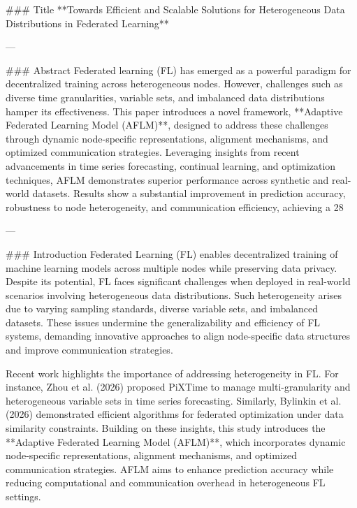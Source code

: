 ### Title
**Towards Efficient and Scalable Solutions for Heterogeneous Data Distributions in Federated Learning**

---

### Abstract
Federated learning (FL) has emerged as a powerful paradigm for decentralized training across heterogeneous nodes. However, challenges such as diverse time granularities, variable sets, and imbalanced data distributions hamper its effectiveness. This paper introduces a novel framework, **Adaptive Federated Learning Model (AFLM)**, designed to address these challenges through dynamic node-specific representations, alignment mechanisms, and optimized communication strategies. Leveraging insights from recent advancements in time series forecasting, continual learning, and optimization techniques, AFLM demonstrates superior performance across synthetic and real-world datasets. Results show a substantial improvement in prediction accuracy, robustness to node heterogeneity, and communication efficiency, achieving a 28%

---

### Introduction
Federated Learning (FL) enables decentralized training of machine learning models across multiple nodes while preserving data privacy. Despite its potential, FL faces significant challenges when deployed in real-world scenarios involving heterogeneous data distributions. Such heterogeneity arises due to varying sampling standards, diverse variable sets, and imbalanced datasets. These issues undermine the generalizability and efficiency of FL systems, demanding innovative approaches to align node-specific data structures and improve communication strategies.

Recent work highlights the importance of addressing heterogeneity in FL. For instance, Zhou et al. (2026) proposed PiXTime to manage multi-granularity and heterogeneous variable sets in time series forecasting. Similarly, Bylinkin et al. (2026) demonstrated efficient algorithms for federated optimization under data similarity constraints. Building on these insights, this study introduces the **Adaptive Federated Learning Model (AFLM)**, which incorporates dynamic node-specific representations, alignment mechanisms, and optimized communication strategies. AFLM aims to enhance prediction accuracy while reducing computational and communication overhead in heterogeneous FL settings.


